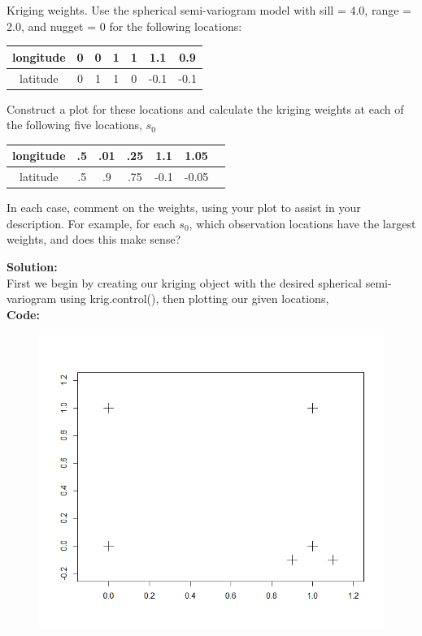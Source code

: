 \documentclass[12pt]{article}
\makeatletter
\theoremstyle{homework}
\newenvironment{exercise}[1]
{\def\@currentlabel{#1}\exercisecore}
{\endexercisecore}
\newcommand{\localhead}[1]{\par\smallskip\noindent\textbf{#1}\nobreak\\}%
\newcommand\solution{\localhead{Solution:}}
\makeatother
\begin{document}
\begin{exercise}{3} Kriging weights. Use the spherical semi-variogram model with sill = 4.0, range = 2.0, and nugget = 0 for the following locations:
  \begin{center}
    \begin{tabular}{c|| c c c c c c }
      longitude & 0 & 0 & 1 & 1 & 1.1 & 0.9\\
      \hline 
      latitude & 0 & 1 & 1 & 0 & -0.1 & -0.1\\
     \end{tabular}
    \end{center}

  Construct a plot for these locations and calculate the kriging weights at each of the following five locations, $s_0$
  \begin{center}
  \begin{tabular}{c|| c c c c c c }
    longitude & .5 & .01 & .25 & 1.1 & 1.05\\
    \hline 
    latitude & .5 & .9 & .75 & -0.1 & -0.05\\
   \end{tabular}
  \end{center}
  In each case, comment on the weights, using your plot to assist in your description. For example, for each $s_0$, which observation locations have the largest 
  weights, and does this make sense?\\
  \solution First we begin by creating our kriging object with the desired spherical semi-variogram using krig.control(), then plotting our given locations, \\
  \textbf{Code:}
  \begin{center}
  
  \end{center}
  \begin{figure}[H]
    \begin{center}
    \includegraphics[width = \textwidth]{Rplot04.png}
    \end{center}
  \end{figure}


\end{exercise}
\end{document}
